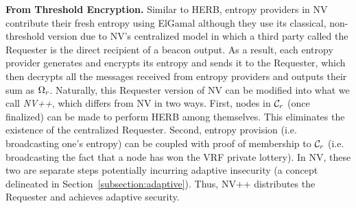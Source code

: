 \noindent\textbf{From Threshold Encryption.} Similar to HERB, entropy providers in NV~\cite{nguyen2019scalable} contribute their fresh entropy using ElGamal although they use its classical, non-threshold version due to NV's centralized model in which a third party called the Requester is the direct recipient of a beacon output. As a result, each entropy provider generates and encrypts its entropy and sends it to the Requester, which then decrypts all the messages received from entropy providers and outputs their sum as $\Omega_r$. Naturally, this Requester version of NV can be modified into what we call \textit{NV++}, which differs from NV in two ways. First, nodes in $\mathcal{C}_r$ (once finalized) can be made to perform HERB among themselves. This eliminates the existence of the centralized Requester. Second, entropy provision (i.e. broadcasting one's entropy) can be coupled with proof of membership to $\mathcal{C}_r$ (i.e. broadcasting the fact that a node has won the VRF private lottery). In NV, these two are separate steps potentially incurring adaptive insecurity (a concept delineated in Section~\ref{subsection:adaptive}). Thus, NV++ distributes the Requester and achieves adaptive security.

